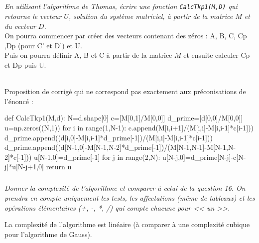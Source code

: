 \documentclass[10pt,fleqn]{article} %
\begin{document}
\begin{multicols}{2}
\begin{multicols}{2}
\subparagraph{}
\textit{En utilisant l'algorithme de Thomas, écrire une fonction \texttt{CalcTkp1(M,D)} 
qui retourne le vecteur $U$, solution du système matriciel, à partir de la matrice 
$M$ et du vecteur $D$.}\\

On pourra commencer par créer  des vecteurs contenant des zéros :
 A, B, C, Cp ,Dp (pour C' et D') et U.\\
 Puis on pourra  définir A, B et C à partir de la matrice $M$ et ensuite calculer Cp et Dp puis U.

\ifprof
\begin{corrige}
~\\
Proposition de corrigé qui ne correspond pas exactement aux préconisations de l'énoncé :

\begin{python}
def CalcTkp1(M,d):
    N=d.shape[0]
    c=[M[0,1]/M[0,0]]
    d_prime=[d[0,0]/M[0,0]]
    u=np.zeros((N,1))
    for i in range(1,N-1):
        c.append(M[i,i+1]/(M[i,i]-M[i,i-1]*c[i-1]))
        d_prime.append((d[i,0]-M[i,i-1]*d_prime[-1])/(M[i,i]-M[i,i-1]*c[i-1]))
    d_prime.append((d[N-1,0]-M[N-1,N-2]*d_prime[-1])/(M[N-1,N-1]-M[N-1,N-2]*c[-1]))
    u[N-1,0]=d_prime[-1]
    for j in range(2,N):
        u[N-j,0]=d_prime[N-j]-c[N-j]*u[N-j+1,0]
    return u
\end{python}
\end{corrige}
\else
\fi

\subparagraph{}
\textit{Donner la complexité de l'algorithme et comparer à celui de la question 16. 
On prendra en compte uniquement les tests, les affectations (même de tableaux)
 et les opérations élémentaires (+, -, *, /) qui compte chacune pour << un >>.}\\

\ifprof
\begin{corrige}
La complexité de l'algorithme est linéaire (à comparer à une complexité cubique pour l'algorithme de Gauss).
\end{corrige}
\else
\fi



\end{multicols}
\end{multicols}
\end{document}
